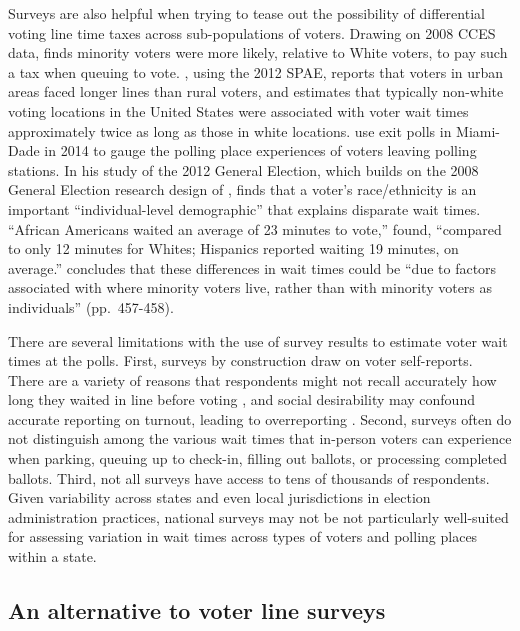 \documentclass[12pt,titlepage]{article}
\begin{document}
Surveys are also helpful when trying to tease out the possibility of
differential voting line time taxes across sub-populations of voters.
Drawing on 2008 CCES data, \cite{mukherjee:timetax} finds minority
voters were more likely, relative to White voters, to pay such a tax
when queuing to vote. \citet{kimball:voting}, using the 2012 SPAE,
reports that voters in urban areas faced longer lines than rural
voters, and \citet{pettigrew:racegapwaittimes} estimates that
typically non-white voting locations in the United States were
associated with voter wait times approximately twice as long as those
in white locations.  \cite{herron:confidence} use exit polls in
Miami-Dade in 2014 to gauge the polling place experiences of voters
leaving polling stations.  In his study of the 2012 General Election,
which builds on the 2008 General Election research design of
\citet{alvarez:survey}, \cite{stewart:waitingtovote2012} finds that a
voter's race/ethnicity is an important ``individual-level
demographic'' that explains disparate wait times.  ``African Americans
waited an average of 23 minutes to vote,''
\citeauthor{stewart:waitingtovote2012} found, ``compared to only 12
minutes for Whites; Hispanics reported waiting 19 minutes, on
average.''  \citeauthor{stewart:waitingtovote2012} concludes that
these differences in wait times could be ``due to factors associated
with where minority voters live, rather than with minority voters as
individuals'' (pp.\ 457-458).

There are several limitations with the use of survey results to
estimate voter wait times at the polls. First, surveys by construction
draw on voter self-reports.  There are a variety of reasons that
respondents might not recall accurately how long they waited in line
before voting \citep[e.g.,][]{sackettetal:timeflies}, and social
desirability may confound accurate reporting on turnout, leading to
overreporting \citep{ansolhersh:bigdata}.  Second, surveys often do
not distinguish among the various wait times that in-person voters can
experience when parking, queuing up to check-in, filling out ballots,
or processing completed ballots. Third, not all surveys have access to
tens of thousands of respondents.  Given variability across states and
even local jurisdictions in election administration practices,
national surveys may not be not particularly well-suited for assessing
variation in wait times across types of voters and polling places
within a state.

\subsection*{An alternative to voter line surveys}
\end{document}
